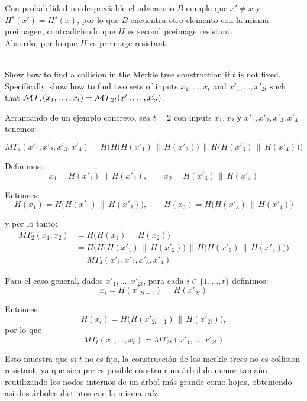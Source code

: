 \documentclass[12pt,addpoints,answers]{exam}
\begin{document}
\begin{questions}
\begin{parts}
\begin{solution}
    Con probabilidad no despreciable el adversario $B$ cumple que $x' \neq x$ y $H^s(x') = H^s(x)$, por lo que $B$ encuentra otro elemento con la misma preimagen, contradiciendo que $H$ es second preimage resistant. \\

    Absurdo, por lo que $H$ es preimage resistant. \\\\ 
\end{solution}
\end{parts}

\question[10] Show how to find a collision in the Merkle tree construction if $t$ is not fixed. Specifically, show how to find two sets of inputs $x_1,\ldots,x_t$ and $x'_1,\ldots,x'_{2t}$ such that ${\cal MT}_t(x_1,\ldots,x_t)={\cal MT}_{2t}(x'_1,\ldots,x'_{2t})$.
\begin{solution}
    Arrancando de un ejemplo concreto, sea $t = 2$ con inputs 
    $x_1, x_2$ y $x'_1, x'_2, x'_3, x'_4$ tenemos:
    
    \[
    MT_4(x'_1, x'_2, x'_3, x'_4)
    =
    H\Big(
        H\big( H(x'_1)\,\|\,H(x'_2) \big)
        \,\Big\|\,
        H\big( H(x'_3)\,\|\,H(x'_4) \big)
    \Big)
    \]
    
    Definimos:
    \[
    x_1 = H(x'_1)\,\|\,H(x'_2), 
    \qquad
    x_2 = H(x'_3)\,\|\,H(x'_4)
    \]
    
    Entonces:
    \[
    H(x_1) = H\big( H(x'_1)\,\|\,H(x'_2) \big),
    \qquad
    H(x_2) = H\big( H(x'_3)\,\|\,H(x'_4) \big)
    \]
    
    y por lo tanto:
   \[
    \begin{aligned}
        MT_2(x_1, x_2)
        &= H\big( H(x_1)\,\|\,H(x_2) \big) \\
        &= H\Big(
            H\big( H(x'_1)\,\|\,H(x'_2) \big)
            \,\Big\|\,
            H\big( H(x'_3)\,\|\,H(x'_4) \big)
        \Big) \\
        &= MT_4(x'_1, x'_2, x'_3, x'_4)
    \end{aligned}
    \]
    
    Para el caso general, dados $x'_1, \ldots, x'_{2t}$, para cada 
    $i \in \{1, \ldots, t\}$ definimos:
    \[
    x_i = H(x'_{2i-1})\,\|\,H(x'_{2i})
    \]
    
    Entonces:
    \[
    H(x_i) = H\big( H(x'_{2i-1})\,\|\,H(x'_{2i}) \big),
    \]
    por lo que
    \[
    MT_t(x_1, \ldots, x_t)
    =
    MT_{2t}(x'_1, \ldots, x'_{2t})
    \]
    
    Esto muestra que si $t$ no es fijo, la construcción de los merkle trees no es collision resistant, ya que siempre es posible construir un árbol de menor tamaño reutilizando los nodos internos de un árbol más grande como hojas, obteniendo así dos árboles distintos con la misma raíz. 
\end{solution}


\end{questions}
\end{document}
